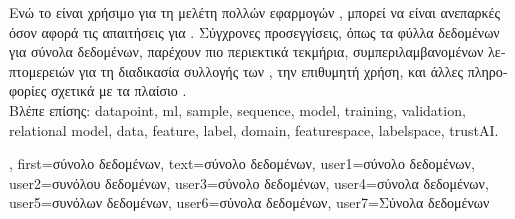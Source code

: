 {{\begin{table}[H]
\begin{tabular}{lcccc}
				\hline
			\end{tabular}
		\end{table}
 		\foreignlanguage{greek}{Ενώ το}  \foreignlanguage{greek}{είναι χρήσιμο για τη μελέτη πολλών 
		εφαρμογών} , \foreignlanguage{greek}{μπορεί να είναι ανεπαρκές όσον αφορά τις απαιτήσεις για} 
		. \foreignlanguage{greek}{Σύγχρονες προσεγγίσεις, όπως τα φύλλα δεδομένων για σύνολα δεδομένων, 
		παρέχουν πιο περιεκτικά τεκμήρια, συμπεριλαμβανομένων λεπτομερειών για τη διαδικασία συλλογής των} , 
		\foreignlanguage{greek}{την επιθυμητή χρήση, και άλλες πληροφορίες σχετικά με τα πλαίσιο} \cite{DatasheetData2021}.
		\\
 		\foreignlanguage{greek}{Βλέπε επίσης:} \gls{datapoint}, \gls{ml}, \gls{sample}, \gls{sequence}, \gls{model}, \gls{training}, \gls{validation}, 
		\gls{relational model}, \gls{data}, \gls{feature}, \gls{label}, \gls{domain}, \gls{featurespace}, \gls{labelspace}, \gls{trustAI}.},
 	first={\foreignlanguage{greek}{σύνολο δεδομένων}},
 	text={\foreignlanguage{greek}{σύνολο δεδομένων}},
 	user1={\foreignlanguage{greek}{σύνολο δεδομένων}}, %
 	user2={\foreignlanguage{greek}{συνόλου δεδομένων}}, %
 	user3={\foreignlanguage{greek}{σύνολο δεδομένων}}, %
 	user4={\foreignlanguage{greek}{σύνολα δεδομένων}}, %
	user5={\foreignlanguage{greek}{συνόλων δεδομένων}}, %
 	user6={\foreignlanguage{greek}{σύνολα δεδομένων}}, %
	user7={\foreignlanguage{greek}{Σύνολα δεδομένων}} %
}


